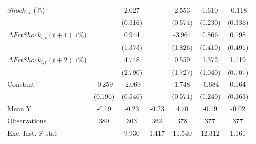 {\begin{tabular}{l*{6}{c}}
\addlinespace
$ Shock_{i,t}$ (\%) &                     &       2.027\sym{***}&                     &       2.553\sym{***}&       0.610\sym{**} &      -0.118         \\
                    &                     &     (0.516)         &                     &     (0.574)         &     (0.230)         &     (0.336)         \\
\addlinespace
$ \Delta FctShock_{i,t}(t+1)$ (\%)&                     &       0.944         &                     &      -3.964\sym{**} &       0.866\sym{**} &       0.198         \\
                    &                     &     (1.373)         &                     &     (1.826)         &     (0.410)         &     (0.491)         \\
\addlinespace
$ \Delta FctShock_{i,t}(t+2)$ (\%)&                     &       4.748         &                     &       0.559         &       1.372         &       1.119         \\
                    &                     &     (2.790)         &                     &     (1.727)         &     (1.040)         &     (0.707)         \\
\addlinespace
Constant            &      -0.259         &      -2.069\sym{***}&                     &       1.748\sym{***}&      -0.684\sym{***}&       0.164         \\
                    &     (0.196)         &     (0.546)         &                     &     (0.571)         &     (0.240)         &     (0.363)         \\
\midrule
Mean Y              &       -0.19         &       -0.23         &       -0.23         &        4.70         &       -0.19         &       -0.02         \\
Observations        &         380         &         363         &         362         &         378         &         377         &         377         \\
Exc. Inst. F-stat   &                     &       9.930         &       1.417         &      11.540         &      12.312         &       1.161         \\
\bottomrule
\end{tabular}
}
